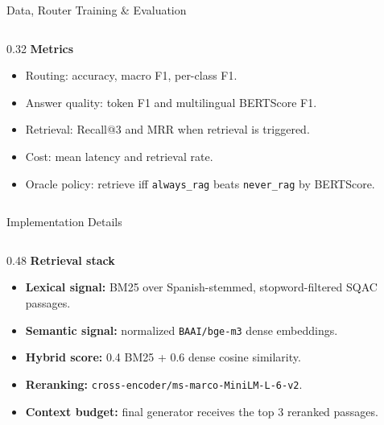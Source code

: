 \documentclass[final]{beamer}
\newcommand{\code}[1]{\texttt{#1}}
\begin{document}
\begin{frame}[t]
\begin{block}{Data, Router Training \& Evaluation}
\begin{columns}[T,onlytextwidth]
\begin{column}{0.32\textwidth}
  \textbf{Metrics}\\[0.3em]
  \small
  \begin{itemize}\setlength\itemsep{0.18em}
    \item Routing: accuracy, macro F1, per-class F1.
    \item Answer quality: token F1 and multilingual BERTScore F1.
    \item Retrieval: Recall@3 and MRR when retrieval is triggered.
    \item Cost: mean latency and retrieval rate.
    \item Oracle policy: retrieve iff \code{always\_rag} beats \code{never\_rag} by BERTScore.
  \end{itemize}
\end{column}

\end{columns}
\end{block}

\begin{block}{Implementation Details}
\begin{columns}[T,onlytextwidth]

\begin{column}{0.48\textwidth}
  \textbf{Retrieval stack}\\[0.3em]
  \small
  \begin{itemize}\setlength\itemsep{0.18em}
    \item \textbf{Lexical signal:} BM25 over Spanish-stemmed, stopword-filtered SQAC passages.
    \item \textbf{Semantic signal:} normalized \code{BAAI/bge-m3} dense embeddings.
    \item \textbf{Hybrid score:} 0.4 BM25 + 0.6 dense cosine similarity.
    \item \textbf{Reranking:} \code{cross-encoder/ms-marco-MiniLM-L-6-v2}.
    \item \textbf{Context budget:} final generator receives the top 3 reranked passages.
  \end{itemize}
\end{column}


\end{columns}
\end{block}
\end{frame}
\end{document}

